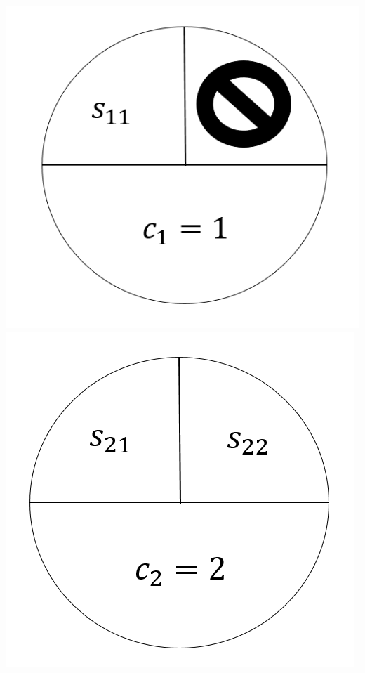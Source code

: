 \documentclass[12pt]{article}
\begin{document}
\includegraphics[scale=0.25]{c1} %
\includegraphics[scale=0.25]{c2} %
\end{document}
